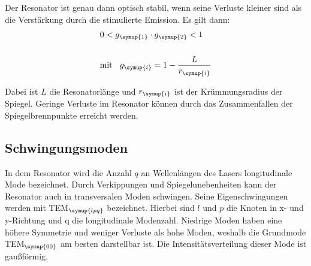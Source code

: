 Der Resonator ist genau dann optisch stabil, wenn seine Verluste
kleiner sind als die Verstärkung durch die stimulierte Emission. Es gilt dann:
\begin{align}
  &0 < g_{\symup{1}} \cdot g_{\symup{2}} < 1 \\
  \\
  &\text{mit} \:\:\:\: g_{\symup{i}} = 1 - \frac{L}{r_{\symup{i}} }
\end{align}

Dabei ist $L$ die Resonatorlänge und $r_{\symup{i}}$ ist der Krümmungsradius der Spiegel.
Geringe Verluste im Resonator können durch das Zusammenfallen der Spiegelbrennpunkte erreicht werden.

\subsection{Schwingungsmoden}
In dem Resonator wird die Anzahl $q$ an Wellenlängen des Lasers longitudinale Mode bezeichnet. Durch
Verkippungen und Spiegelunebenheiten kann der Resonator auch in transversalen Moden schwingen.
Seine Eigenschwingungen werden mit TEM$_{\symup{lpq}}$ bezeichnet. Hierbei sind $l$ und $p$
die Knoten in x- und y-Richtung und q die longitudinale Modenzahl. Niedrige Moden
haben eine höhere Symmetrie und weniger Verluste als hohe Moden, weshalb die Grundmode
TEM$_{\symup{00}}$ am besten darstellbar ist. Die Intensitätsverteilung dieser Mode
ist gaußförmig.
